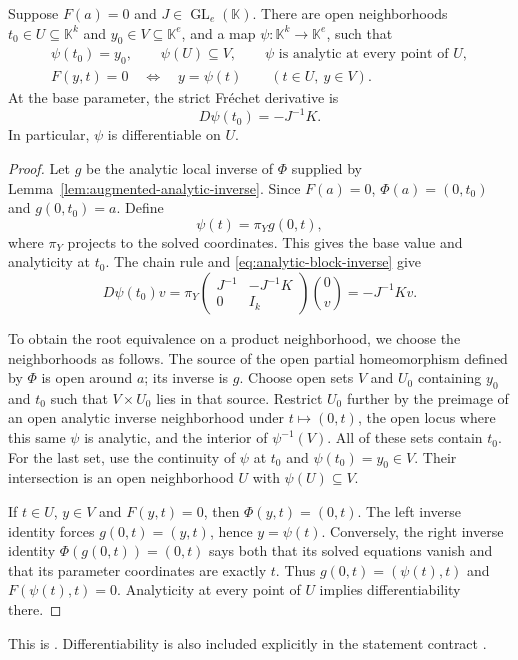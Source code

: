 \begin{theorem}
\label{thm:analytic-local-graph}
Suppose $F(a)=0$ and $J\in\operatorname{GL}_e(\mathbb K)$. There are open
neighborhoods $t_0\in U\subseteq\mathbb K^k$ and
$y_0\in V\subseteq\mathbb K^e$, and a map
$\psi:\mathbb K^k\to\mathbb K^e$, such that
\begin{gather}
 \psi(t_0)=y_0,\qquad \psi(U)\subseteq V,\qquad
 \psi\text{ is analytic at every point of }U,\label{eq:analytic-psi}\\
 F(y,t)=0\quad\Longleftrightarrow\quad y=\psi(t)
 \qquad(t\in U,\ y\in V).\label{eq:analytic-root-graph}
\end{gather}
At the base parameter, the strict Fr\'echet derivative is
\begin{equation}
 \boxed{D\psi(t_0)=-J^{-1}K.}
 \label{eq:implicit-derivative}
\end{equation}
In particular, $\psi$ is differentiable on $U$.
\end{theorem}
\begin{proof}
Let $g$ be the analytic local inverse of $\Phi$ supplied by
Lemma~\ref{lem:augmented-analytic-inverse}. Since $F(a)=0$,
$\Phi(a)=(0,t_0)$ and $g(0,t_0)=a$. Define
\[
 \psi(t)=\pi_Yg(0,t),
\]
where $\pi_Y$ projects to the solved coordinates. This gives the base value
and analyticity at $t_0$. The chain rule and
\eqref{eq:analytic-block-inverse} give
\[
 D\psi(t_0)v
 =\pi_Y\begin{pmatrix}J^{-1}&-J^{-1}K\\0&I_k\end{pmatrix}
       \binom{0}{v}
 =-J^{-1}Kv.
\]

To obtain the root equivalence on a product neighborhood, we choose the
neighborhoods as follows. The source of the open partial homeomorphism defined by
$\Phi$ is open around $a$; its inverse is $g$. Choose open sets $V$ and $U_0$
containing $y_0$ and $t_0$ such that
$V\times U_0$ lies in that source. Restrict $U_0$ further by the preimage of
an open analytic inverse neighborhood under $t\mapsto(0,t)$, the open locus
where this same $\psi$ is analytic, and the interior of $\psi^{-1}(V)$.
All of these sets contain $t_0$. For the last set, use the continuity of
$\psi$ at $t_0$ and $\psi(t_0)=y_0\in V$. Their intersection is an open
neighborhood $U$ with $\psi(U)\subseteq V$.

If $t\in U$, $y\in V$ and $F(y,t)=0$, then
$\Phi(y,t)=(0,t)$. The left inverse identity forces
$g(0,t)=(y,t)$, hence $y=\psi(t)$. Conversely, the right inverse identity
$\Phi(g(0,t))=(0,t)$ says both that its solved equations vanish and that its
parameter coordinates are exactly $t$. Thus
$g(0,t)=(\psi(t),t)$ and $F(\psi(t),t)=0$.
Analyticity at every point of $U$ implies differentiability there.
\end{proof}
This is
.
Differentiability is also included explicitly in the statement contract
.

